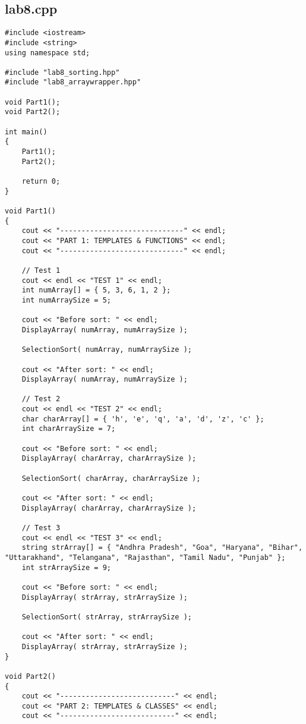 \documentclass[a4paper,12pt,oneside]{book}
\begin{document}
    \subsection*{lab8.cpp}
    
    \begin{lstlisting}[style=code]
#include <iostream>
#include <string>
using namespace std;

#include "lab8_sorting.hpp"
#include "lab8_arraywrapper.hpp"

void Part1();
void Part2();

int main()
{
    Part1();
    Part2();

    return 0;
}

void Part1()
{
    cout << "-----------------------------" << endl;
    cout << "PART 1: TEMPLATES & FUNCTIONS" << endl;
    cout << "-----------------------------" << endl;

    // Test 1
    cout << endl << "TEST 1" << endl;
    int numArray[] = { 5, 3, 6, 1, 2 };
    int numArraySize = 5;

    cout << "Before sort: " << endl;
    DisplayArray( numArray, numArraySize );

    SelectionSort( numArray, numArraySize );

    cout << "After sort: " << endl;
    DisplayArray( numArray, numArraySize );

    // Test 2
    cout << endl << "TEST 2" << endl;
    char charArray[] = { 'h', 'e', 'q', 'a', 'd', 'z', 'c' };
    int charArraySize = 7;

    cout << "Before sort: " << endl;
    DisplayArray( charArray, charArraySize );

    SelectionSort( charArray, charArraySize );

    cout << "After sort: " << endl;
    DisplayArray( charArray, charArraySize );

    // Test 3
    cout << endl << "TEST 3" << endl;
    string strArray[] = { "Andhra Pradesh", "Goa", "Haryana", "Bihar", "Uttarakhand", "Telangana", "Rajasthan", "Tamil Nadu", "Punjab" };
    int strArraySize = 9;

    cout << "Before sort: " << endl;
    DisplayArray( strArray, strArraySize );

    SelectionSort( strArray, strArraySize );

    cout << "After sort: " << endl;
    DisplayArray( strArray, strArraySize );
}

void Part2()
{
    cout << "---------------------------" << endl;
    cout << "PART 2: TEMPLATES & CLASSES" << endl;
    cout << "---------------------------" << endl;


\end{lstlisting}
\end{document}
